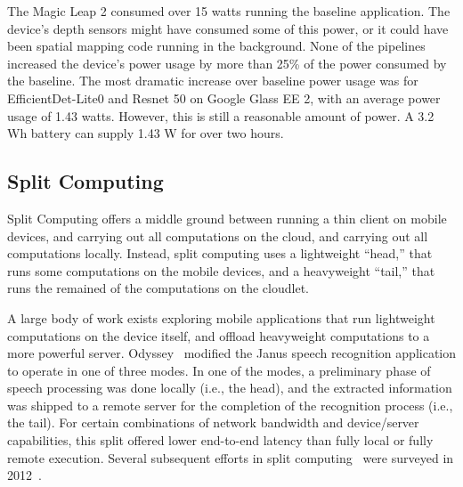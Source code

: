 The Magic Leap 2 consumed over 15 watts running the baseline application.
The device's depth sensors might have consumed some of this power, or it could
have been spatial mapping code running in the background.
None of the pipelines increased the device's power usage by more than 25\% of
the power consumed by the baseline.
The most dramatic increase over baseline power usage was for EfficientDet-Lite0
and Resnet 50 on Google Glass EE 2, with an average power usage of 1.43 watts.
However, this is still a reasonable amount of power.
A 3.2 Wh battery can supply 1.43 W for over two hours.

\subsection{Split Computing}

Split Computing offers a middle ground between running a thin client on mobile
devices, and carrying out all computations on the cloud, and carrying out all
computations locally.
Instead, split computing uses a lightweight ``head,'' that runs some
computations on the mobile devices, and a heavyweight ``tail,'' that runs the
remained of the computations on the cloudlet.

A large body of work exists exploring mobile applications that run lightweight
computations on the device itself, and offload heavyweight computations to a
more powerful server.
Odyssey~\cite{Noble1997} modified the Janus speech recognition application to
operate in one of three modes.
In one of the modes, a preliminary phase of speech
processing was done locally (i.e., the head), and the extracted
information was shipped to a remote server for the completion of the
recognition process (i.e., the tail).
For certain combinations of
network bandwidth and device/server capabilities, this split offered
lower end-to-end latency than fully local or fully remote execution.
Several subsequent efforts in split computing~\cite{Balan2002, Flinn2001,
  Flinn2003b, Narayanan2003, Goyal2004, Su2005, Ok2007, Balan2007,
  Kristensen2008} were surveyed in 2012~\cite{Flinn2012}.

